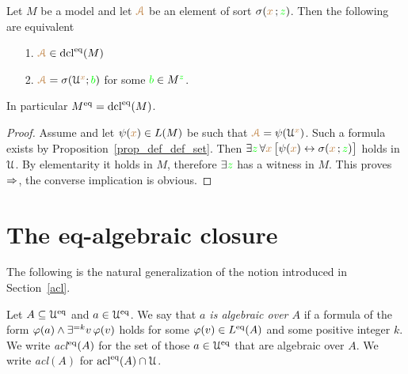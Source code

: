 \begin{proposition}\label{prop_standard_def_set}
Let $M$ be a model and let ${\color{brown}\EuScript A}$ be an element of sort $\sigma({\color{brown} x}\,;{\color{green} z})$.
Then the following are equivalent
\begin{itemize}
\item[1.]  ${\color{brown}\EuScript A}\in{\rm dcl}^{{\rm eq}}(M)$
\item[2.]  ${\color{brown}\EuScript A}=\sigma(\EuScript U^{\color{brown} x};{\color{green} b})$ for some ${\color{green} b}\in M^{\color{green} z}$.
\end{itemize}
In particular $M^{{\rm eq}}={\rm dcl}^{{\rm eq}}(M)$.
\end{proposition}

\begin{proof}
Assume  and let $\psi({\color{brown} x})\in L(M)$ be such that ${\color{brown}\EuScript A}=\psi(\EuScript U^{\color{brown} x})$.
Such a formula exists by Proposition~\ref{prop_def_def_set}.
Then $\exists{\color{green}z}\,\forall{\color{brown}x}\,\big[\psi({\color{brown} x})\leftrightarrow\sigma({\color{brown} x}\,;{\color{green} z})\big]$ holds in $\EuScript U$.
By elementarity it holds in $M$, therefore $\exists{\color{green}z}$ has a witness in $M$.
This proves $\Rightarrow$, the converse implication is obvious.
\end{proof}

\section{The eq-algebraic closure}

The following is the natural generalization of the notion introduced in Section~\ref{acl}.

\begin{definition}
  Let $A\subseteq\EuScript U^{{\rm eq}}$ and $a\in\EuScript U^{{\rm eq}}$.
  We say that \emph{$a$ is algebraic over $A$\/} if a formula of the form $\varphi(a)\wedge\exists^{=k}v\,\varphi(v)$ holds for some $\varphi(v)\in L^{{\rm eq}}(A)$ and some positive integer $k$.
  We write \emph{\rm acl$^{\rm eq}(A)$\/} for the set of those $a\in\EuScript U^{{\rm eq}}$ that are algebraic over $A$.
  We write \emph{\rm acl$(A)$\/} for ${\rm acl}^{{\rm eq}}(A)\cap\EuScript U$.
\end{definition}


